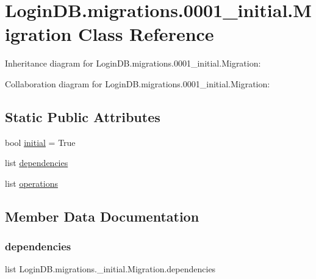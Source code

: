 \hypertarget{class_login_d_b_1_1migrations_1_10001__initial_1_1_migration}{}\section{Login\+D\+B.\+migrations.0001\+\_\+initial.Migration Class Reference}
\label{class_login_d_b_1_1migrations_1_10001__initial_1_1_migration}


Inheritance diagram for Login\+D\+B.\+migrations.0001\+\_\+initial.Migration\+:


Collaboration diagram for Login\+D\+B.\+migrations.0001\+\_\+initial.Migration\+:
\subsection*{Static Public Attributes}
\begin{DoxyCompactItemize}
\item 
bool \hyperlink{class_login_d_b_1_1migrations_1_10001__initial_1_1_migration_a781760a44c66be2b67a1307580da0af4}{initial} = True
\item 
list \hyperlink{class_login_d_b_1_1migrations_1_10001__initial_1_1_migration_a1a363617086b3ac2a48850e1484d2a64}{dependencies}
\item 
list \hyperlink{class_login_d_b_1_1migrations_1_10001__initial_1_1_migration_abb908b6518006a1a23e9ee78fa0c3b89}{operations}
\end{DoxyCompactItemize}


\subsection{Member Data Documentation}
\mbox{\label{class_login_d_b_1_1migrations_1_10001__initial_1_1_migration_a1a363617086b3ac2a48850e1484d2a64}} 
\subsubsection{\texorpdfstring{dependencies}{dependencies}}
{\footnotesize\ttfamily list Login\+D\+B.\+migrations.\+\_\+initial.\+Migration.\+dependencies\hspace{0.3cm}{\ttfamily [static]}}

